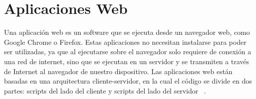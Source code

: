 %

\section{Aplicaciones Web}
Una aplicación web es un software que se ejecuta desde un navegador web, como Google Chrome o Firefox. Estas aplicaciones no necesitan instalarse para poder ser utilizadas, ya que al ejecutarse sobre el navegador solo requiere de conexión a una red de internet, sino que se ejecutan en un servidor y se transmiten a través de Internet al navegador de nuestro dispositivo.
Las aplicaciones web están basadas en una arquitectura cliente-servidor, en la cual el código se divide en dos partes: scripts del lado del cliente y scripts del lado del servidor ~\cite{apliacionWebAmazon}.\newline 


